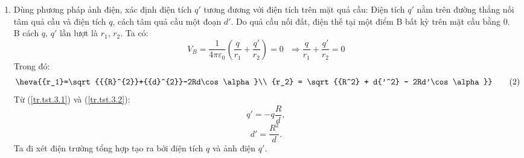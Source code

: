 \begin{loigiai}
    \begin{enumerate}[1)]
        \item Dùng phương pháp ảnh điện, xác định điện tích $q'$ tương đương với điện tích trên mặt quả cầu:
        Điện tích $q'$ nằm trên đường thẳng nối tâm quả cầu và điện tích $q$, cách tâm quả cầu một đoạn $d'$. Do quả cầu nối đất, điện thế tại một điểm B bất kỳ trên mặt cầu bằng $0$. B cách $q$, $q'$ lần lượt là $r_1$, $r_2$. Ta có:
    \[{{V}_{B}}=\dfrac{1}{4\pi {{\varepsilon }_{0}}}\left( \dfrac{q}{{{r}_{1}}}+\dfrac{q'}{{{r}_{2}}} \right)=0 \,\,\,\,\Rightarrow \dfrac{q}{{{r}_{1}}}+\dfrac{q'}{{{r}_{2}}}=0 \tag{1} \label{tr.tst.3.1} \]
    Trong đó: 
    \[\heva{{r_1}=\sqrt{{{R}^{2}}+{{d}^{2}}-2Rd\cos \alpha }\\
        {r_2} = \sqrt {{R^2} + d{'^2} - 2Rd'\cos \alpha }} \tag{2} \label{tr.tst.3.2}\]
    Từ (\ref{tr.tst.3.1}) và (\ref{tr.tst.3.2}):
    \[q'=-q\dfrac{R}{d},\]
    \[d'=\dfrac{R^2}{d}.\]
    Ta đi xét điện trường tổng hợp tạo ra bởi điện tích $q$ và ảnh điện $q'$.
    \begin{center}
        


\begin{tikzpicture}[x=0.75pt,y=0.75pt,yscale=-1,xscale=1]


\end{tikzpicture}
\end{center}
\end{enumerate}
\end{loigiai}
